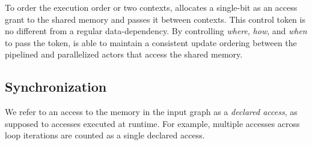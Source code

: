 To order the execution order or two contexts, \name allocates a single-bit  as 
an access grant to the shared memory and passes it between contexts. 
This control token is no different from a regular data-dependency.
By controlling {\em where}, {\em how}, and {\em when} to pass the token, \name 
is able to maintain a consistent update ordering between the pipelined and parallelized actors that access the shared memory.




\subsection{Synchronization} 
\label{sec:sync}
We refer to an access to the memory in the input graph as a \emph{declared access}, as supposed to accesses executed at runtime.
For example, multiple accesses across loop iterations are counted as a single declared access.

